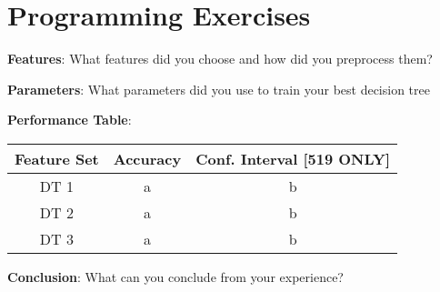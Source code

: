 \documentclass{article}
\begin{document}
        
        \section{Programming Exercises}
        \textbf{Features}: What features did you choose and how did you preprocess them?
        
        \noindent\textbf{Parameters}: What parameters did you use to train your best decision tree
        
        \noindent\textbf{Performance Table}: 
        \begin{center}
            \begin{tabular}{|c|c|c|}
                \hline
                Feature Set & Accuracy & Conf. Interval [519 ONLY]\\
                \hline
                DT 1 & a & b  \\
                DT 2 & a & b  \\
                DT 3 & a & b  \\
                \hline
        \end{tabular}
                \end{center}
        
        
        
        \textbf{Conclusion}: What can you conclude from your experience?
        
\end{document}
